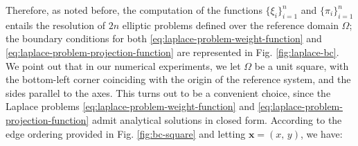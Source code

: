 \documentclass[12pt, a4paper, twoside, openright, notitlepage]{report}
\numberwithin{equation}{chapter}
\theoremstyle{theorem}
\theoremstyle{definition}
\theoremstyle{remark}
\theoremstyle{proposition}
\numberwithin{figure}{chapter}
\newcommand{\bg}[1]{\boldsymbol{#1}}
\begin{document}
		Therefore, as noted before, the computation of the functions $\big\lbrace \xi_i \big\rbrace_{i = 1}^n$ and $\big\lbrace \pi_i \big\rbrace_{i = 1}^n$ entails the resolution of $2n$ elliptic problems defined over the reference domain $\Omega$; the boundary conditions for both \eqref{eq:laplace-problem-weight-function} and \eqref{eq:laplace-problem-projection-function} are represented in Fig. \ref{fig:laplace-bc}. We point out that in our numerical experiments, we let $\Omega$ be a unit square, with the bottom-left corner coinciding with the origin of the reference system, and the sides parallel to the axes. This turns out to be a convenient choice, since the Laplace problems \eqref{eq:laplace-problem-weight-function} and \eqref{eq:laplace-problem-projection-function} admit analytical solutions in closed form. According to the edge ordering provided in Fig. \ref{fig:bc-square} and letting $\bg{x} = (x, \, y)$, we have:
		
\end{document}
